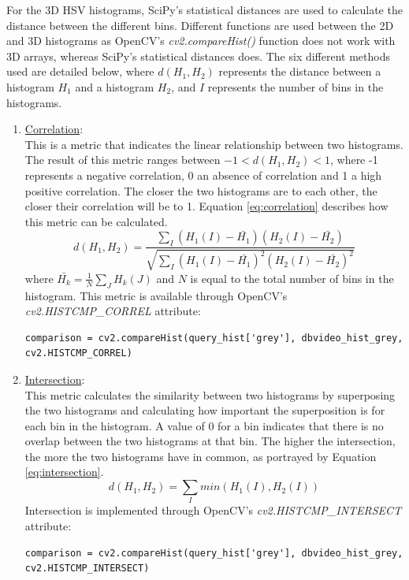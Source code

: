 For the 3D HSV histograms, SciPy's statistical distances are used to calculate the distance between the different bins. Different functions are used between the 2D and 3D histograms as OpenCV's \textit{cv2.compareHist()} function does not work with 3D arrays, whereas SciPy's statistical distances does. The six different methods used are detailed below, where $d(H_1, H_2)$ represents the distance between a histogram $H_1$ and a histogram $H_2$, and $I$ represents the number of bins in the histograms.

\begin{enumerate}

    \item \underline{Correlation}:\\
    This is a metric that indicates the linear relationship between two histograms. The result of this metric ranges between $-1 < d(H_1,H_2) < 1$, where -1 represents a negative correlation, 0 an absence of correlation and 1 a high positive correlation. The closer the two histograms are to each other, the closer their correlation will be to 1. Equation \ref{eq:correlation} describes how this metric can be calculated.
    \begin{equation}
    \label{eq:correlation}
        d(H_1,H_2)=\frac{\sum _I(H_1(I)-\bar{H_1})(H_2(I)-\bar{H_2})}{\sqrt{\sum _I(H_1(I)-\bar{H_1})^2(H_2(I)-\bar{H_2})^2}}
    \end{equation}
    where $\bar{H_k}=\frac{1}{N}\sum_JH_k(J)$ and $N$ is equal to the total number of bins in the histogram. This metric is available through OpenCV's \textit{cv2.HISTCMP\_CORREL} attribute:
\begin{lstlisting}[numbers=none]
comparison = cv2.compareHist(query_hist['grey'], dbvideo_hist_grey, cv2.HISTCMP_CORREL)
\end{lstlisting}

    \item \underline{Intersection}:\\
    This metric calculates the similarity between two histograms by superposing the two histograms and calculating how important the superposition is for each bin in the histogram. A value of 0 for a bin indicates that there is no overlap between the two histograms at that bin. The higher the intersection, the more the two histograms have in common, as portrayed by Equation \ref{eq:intersection}.
    \begin{equation}
    \label{eq:intersection}
        d(H_1,H_2)=\sum_Imin(H_1(I),H_2(I))
    \end{equation}
    Intersection is implemented through OpenCV's \textit{cv2.HISTCMP\_INTERSECT} attribute:
\begin{lstlisting}[numbers=none]
comparison = cv2.compareHist(query_hist['grey'], dbvideo_hist_grey, cv2.HISTCMP_INTERSECT)
\end{lstlisting}


\end{enumerate}
